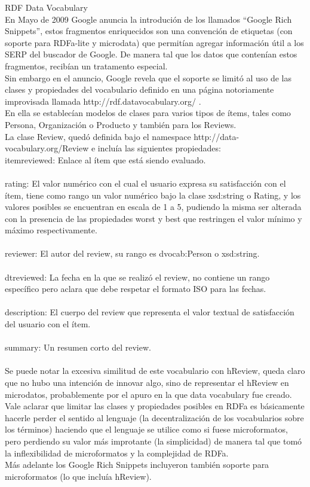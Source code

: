 RDF Data Vocabulary\\
En Mayo de 2009 Google anuncia la introdución de los llamados ``Google Rich Snippets'', estos fragmentos enriquecidos son una convención 
de etiquetas (con soporte para RDFa-lite y microdata) que permitían agregar información útil a los SERP del buscador de Google. De manera tal 
que los datos que contenían estos fragmentos, recibían un tratamento especial.\\
Sin embargo en el anuncio, Google revela que el soporte se limitó al uso de las clases y propiedades del vocabulario definido en una página 
notoriamente improvisada llamada http://rdf.datavocabulary.org/ . \\
En ella se establecían modelos de clases para varios tipos de ítems, tales como Persona, Organización o Producto y también para los Reviews.\\
La clase Review, quedó definida bajo el namespace http://data-vocabulary.org/Review e incluía las siguientes propiedades:\\
itemreviewed: Enlace al ítem que está siendo evaluado.\\
\\
rating: El valor numérico con el cual el usuario expresa su satisfacción con el ítem, tiene como rango un valor numérico bajo la clase 
xsd:string o Rating, y los valores posibles se encuentran en escala de 1 a 5, pudiendo la misma ser alterada con la presencia de las 
propiedades worst y best que restringen el valor mínimo y máximo respectivamente.\\
\\
reviewer: El autor del review, su rango es dvocab:Person o xsd:string.\\
\\
dtreviewed: La fecha en la que se realizó el review, no contiene un rango específico pero aclara que debe respetar el formato 
ISO para las fechas.\\
\\
description: El cuerpo del review que representa el valor textual de satisfacción del usuario con el ítem.\\
\\
summary: Un resumen corto del review.\\
\\
Se puede notar la excesiva similitud de este vocabulario con hReview, queda claro que no hubo una intención de innovar algo, 
sino de representar el hReview en microdatos, probablemente por el apuro en la que data vocabulary fue creado.\\
Vale aclarar que limitar las clases y propiedades posibles en RDFa es básicamente hacerle perder el sentido al lenguaje 
(la decentralización de los vocabularios sobre los términos) haciendo que el lenguaje se utilice como si fuese microformatos, 
pero perdiendo su valor más improtante (la simplicidad) de manera tal que tomó la inflexibilidad de microformatos y la complejidad 
de RDFa.\\
Más adelante los Google Rich Snippets incluyeron también soporte para microformatos (lo que incluía hReview). \\